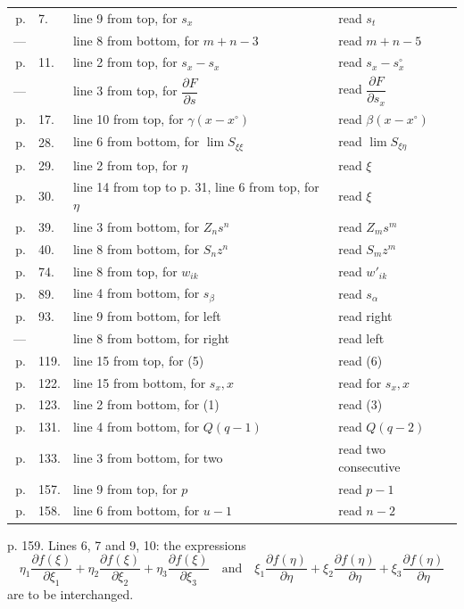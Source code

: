 \documentclass[10pt]{article}
\begin{document}
\begin{tabular}{@{}r@{\ }l@{\ }l@{\ }l@{}}
p. & 7. & line 9 from top, for $s_x$ & read $s_t$\\
--- & & line 8 from bottom, for $m+n-3$ & read $m+n-5$\\
p. & 11. & line 2 from top, for $s_x-s_x$ & read $s_x-s_x^\circ$\\
--- & & line 3 from top, for $\dfrac{\partial F}{\partial s}$ & read $\dfrac{\partial F}{\partial s_x}$\\
p. & 17. & line 10 from top, for $\gamma(x-x^\circ)$ & read $\beta(x-x^\circ)$\\
p. & 28. & line 6 from bottom, for $\lim S_{\xi\xi}$ & read $\lim S_{\xi\eta}$\\
p. & 29. & line 2 from top, for $\eta$ & read $\xi$\\
p. & 30. & line 14 from top to p. 31, line 6 from top, for $\eta$ & read $\xi$\\
p. & 39. & line 3 from bottom, for $Z_ns^n$ & read $Z_ms^m$\\
p. & 40. & line 8 from bottom, for $S_nz^n$ & read $S_mz^m$\\
p. & 74. & line 8 from top, for $w_{ik}$ & read $w'_{ik}$\\
p. & 89. & line 4 from bottom, for $s_\beta$ & read $s_\alpha$\\
p. & 93. & line 9 from bottom, for left & read right\\
--- & & line 8 from bottom, for right & read left\\
p. & 119. & line 15 from top, for (5) & read (6)\\
p. & 122. & line 15 from bottom, for $s_x, x$ & read for $s_x, x$\\
p. & 123. & line 2 from bottom, for (1) & read (3)\\
p. & 131. & line 4 from bottom, for $Q(q-1)$ & read $Q(q-2)$\\
p. & 133. & line 3 from bottom, for two & read two consecutive\\
p. & 157. & line 9 from top, for $p$ & read $p-1$\\
p. & 158. & line 6 from bottom, for $u-1$ & read $n-2$\\
\end{tabular}

\vspace{0.7em}
\noindent p. 159. Lines 6, 7 and 9, 10: the expressions
\[
\eta_1\frac{\partial f(\xi)}{\partial \xi_1}
+\eta_2\frac{\partial f(\xi)}{\partial \xi_2}
+\eta_3\frac{\partial f(\xi)}{\partial \xi_3}
\quad\text{and}\quad
\xi_1\frac{\partial f(\eta)}{\partial \eta}
+\xi_2\frac{\partial f(\eta)}{\partial \eta}
+\xi_3\frac{\partial f(\eta)}{\partial \eta}
\]
are to be interchanged.
\end{document}

